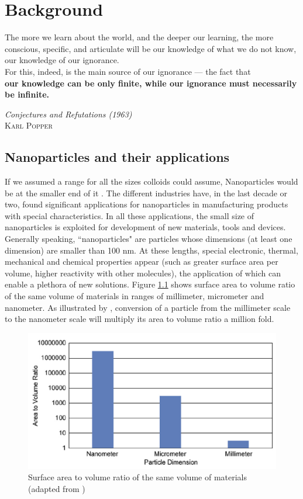 \chapter{Background} \label{chap:background}
\vspace*{\fill}
\epigraph{The more we learn about the world, and the deeper our learning, the more conscious, specific, and articulate will be our knowledge of what we do not know, our knowledge of our ignorance.\\ For this, indeed, is the main source of our ignorance — the fact that\\ \textbf{our knowledge can be only finite, while our ignorance must necessarily be infinite.}}%
{\textit{Conjectures and Refutations (1963)}\\ \textsc{Karl Popper}}
\clearpage{\thispagestyle{empty}\cleardoublepage}
\section{Nanoparticles and their applications}
If we assumed a range for all the sizes colloids could assume, Nanoparticles would be at the smaller end of it \citep{Goodwin2009}. The different industries have, in the last decade or two, found significant applications for nanoparticles in manufacturing products with special characteristics. In all these applications, the small size of nanoparticles is exploited for development of new materials, tools and devices. Generally speaking, ``nanoparticles" are particles whose dimensions (at least one dimension) are smaller than 100 nm. At these lengths, special electronic, thermal, mechanical and chemical properties appear (such as greater surface area per volume, higher reactivity with other molecules), the application of which can enable a plethora of new solutions. Figure \ref{cht:NPsurfaceVolume} shows surface area to volume ratio of the same volume of materials in ranges of millimeter, micrometer and nanometer. As illustrated by \cite{Amanullah2009}, conversion of a particle from the millimeter scale to the nanometer scale will multiply its area to volume ratio a million fold. 
\begin{figure}[h]
    \centering
    \includegraphics[width=\textwidth]{img/cht/NPsurfaceVolume.png}
    \caption{Surface area to volume ratio of the same volume of materials (adapted from \cite{Amanullah2009})}
    \label{cht:NPsurfaceVolume}
\end{figure}

